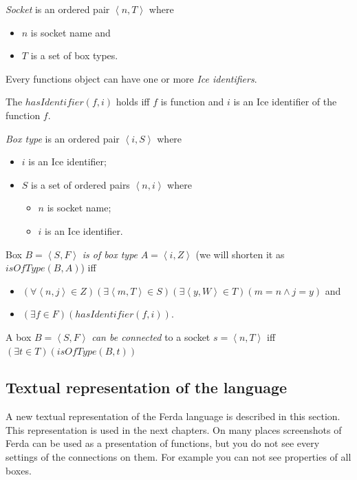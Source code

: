 \documentclass[a4paper,12pt]{book}
\begin{document}
\begin{mydef}
\emph{Socket} is an ordered pair $\left<n,T\right>$ where
\begin{itemize}
	\item $n$ is socket name and
	\item $T$ is a set of box types.
\end{itemize}
\end{mydef}

Every functions object can have one or more \emph{Ice identifiers}.

\begin{mydef}
The \emph{$hasIdentifier(f,i)$} holds iff $f$ is function and $i$ is an Ice identifier of the function $f$.
\end{mydef}

\begin{mydef}
\emph{Box type} is an ordered pair $\left<i,S\right>$ where
\begin{itemize}
	\item $i$ is an Ice identifier;
	\item $S$ is a set of ordered pairs $\left<n,i\right>$ where
	\begin{itemize}
		\item $n$ is socket name;
		\item $i$ is an Ice identifier.
	\end{itemize}
\end{itemize}
\end{mydef}

\begin{mydef}
Box $B=\left<S,F\right>$ \emph{is of box type} $A=\left<i,Z\right>$ (we will shorten it as $isOfType(B,A)$) iff 
\begin{itemize}
	\item $(\forall \left<n,j\right>\in Z)(\exists \left<m,T\right>\in S)(\exists \left<y,W\right>\in T)(m=n \wedge j=y)$ and
	\item $(\exists f\in F)(hasIdentifier(f,i))$.
\end{itemize}
\end{mydef}

\begin{mydef}
A box $B=\left<S,F\right>$ \emph{can be connected} to a socket $s=\left<n,T\right>$ iff $(\exists t\in T)(isOfType(B,t))$
\end{mydef}

\subsection{Textual representation of the language}
\label{sec:formalisation}
A new textual representation of the Ferda language is described in this section. This representation is used in the next chapters. On many places screenshots of Ferda can be used as a presentation of functions, but you do not see every settings of the connections on them. For example you can not see properties of all boxes.
\end{document}
